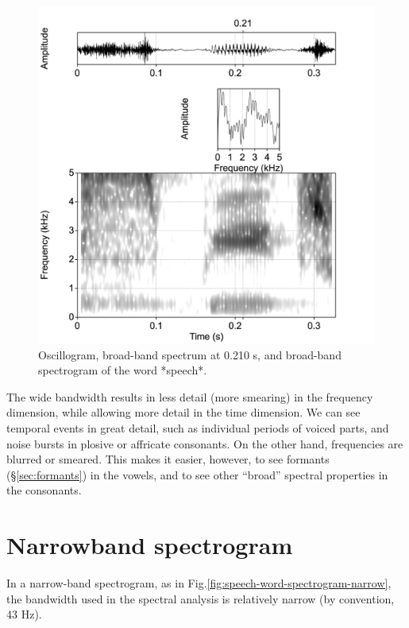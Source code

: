 \documentclass[
]{book}
\begin{document}
\begin{figure}

{\centering \includegraphics{figures/speech_word_spectrogram_5ms} 

}

\caption{Oscillogram, broad-band spectrum at 0.210 s, and broad-band spectrogram of the word *speech*.}\label{fig:speech-word-spectrogram-broad}
\end{figure}

The wide bandwidth results in less detail (more smearing) in the frequency dimension, while allowing more detail in the time dimension. We can see temporal events in great detail, such as individual periods of voiced parts, and noise bursts in plosive or affricate consonants. On the other hand, frequencies are blurred or smeared. This makes it easier, however, to see formants (§\ref{sec:formants}) in the vowels, and to see other ``broad'' spectral properties in the consonants.

\section{Narrowband spectrogram}\label{narrowband-spectrogram}

In a narrow-band spectrogram, as in Fig.\ref{fig:speech-word-spectrogram-narrow}, the bandwidth used in the spectral analysis is relatively narrow (by convention, 43 Hz).
\end{document}
